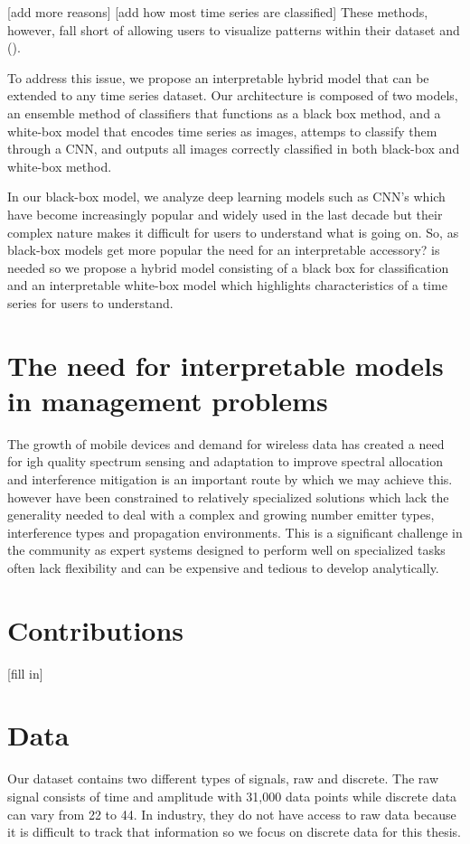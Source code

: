 \documentclass{turabian-thesis}
\begin{document}
[add more reasons]
[add how most time series are classified]
These methods, however, fall short of allowing users to visualize patterns within their dataset and ().

To address this issue, we propose an interpretable hybrid  model that can be extended to any time series dataset. Our architecture is composed of two models, an ensemble method of classifiers that functions as a black box method, and a white-box model that encodes time series as images, attemps to classify them through a CNN, and outputs all images correctly classified in both black-box and white-box method.

In our black-box model, we analyze  deep learning models such as CNN’s which have become increasingly popular and widely used in the last decade but their complex nature makes it difficult for users to understand what is going on. So, as black-box models get more popular the need for an interpretable accessory? is needed so we propose a hybrid model consisting of a black box for classification and an interpretable white-box model which highlights characteristics of a time series for users to understand.

\section{The need for interpretable models in management problems}
The growth of mobile devices and demand for wireless data has created a need for igh quality spectrum sensing and adaptation to improve spectral allocation and interference mitigation is an important route by which we may achieve this.  however have been constrained to relatively specialized solutions which lack the generality needed to deal with a complex and growing number emitter types, interference types and propagation environments.
This is a significant challenge in the community as expert systems designed to perform well on specialized tasks often lack flexibility and can be expensive and tedious to develop analytically.

\section{Contributions}
[fill in]

\section{Data}
Our dataset contains two different types of signals, raw and discrete. The raw signal consists of time and amplitude with 31,000 data points while discrete data can vary from 22 to 44. In industry, they do not have access to raw data because it is difficult to track that information so we focus on discrete data for this thesis.
\end{document}
